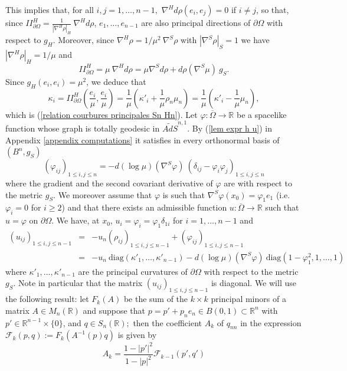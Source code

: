 \documentclass[10pt,reqno,oneside]{amsart}
\theoremstyle{definition}
\theoremstyle{remark}
\newcommand{\R}{\mathbb{R}}
\begin{document}
This implies that, for all $i,j=1,\ldots,n-1,$ $\nabla^{H}d\rho(e_i,e_j)=0$ if $i\neq j$, so that, since $II_{\partial\Omega}^H=\frac{1}{|\nabla^H\rho|_H}\ \nabla^Hd\rho$, $e_1,\ldots,e_{n-1}$ are also principal directions of $\partial\Omega$ with respect to $g_{H}.$ Moreover, since $\nabla^H\rho=1/\mu^2\ \nabla^S\rho$ with $|\nabla^S\rho|_S=1$ we have $|\nabla^H\rho|_H=1/\mu$ and
$$II_{\partial\Omega}^H=\mu\ \nabla^Hd\rho=\mu\nabla^Sd\rho+d\rho(\nabla^S\mu)\ g_S.$$ 
Since $g_{H}(e_i,e_i)=\mu^2$, we deduce that
$$\kappa_i=II_{\partial\Omega}^H\left(\frac{e_i}{\mu},\frac{e_i}{\mu}\right)=\frac{1}{\mu}\left(\kappa'_i+\frac{1}{\mu}\rho_n\mu_n\right)=\frac{1}{\mu}\left(\kappa'_i-\frac{1}{\mu}\mu_n\right),$$
which is (\ref{relation courbures principales Sn Hn}). Let $\varphi:\overline{\Omega}\rightarrow\R$ be a spacelike function whose graph is totally geodesic in $\widetilde{AdS}^{n,1}.$ By (\ref{lem expr h u}) in Appendix \ref{appendix computations} it satisfies in every orthonormal basis of $(B^n,g_S)$
$$\left(\varphi_{ij}\right)_{1\leq i,j\leq n}=-d(\log\mu)(\nabla^S\varphi)\ \left(\delta_{ij}-\varphi_i\varphi_j\right)_{1\leq i,j\leq n}$$
where the gradient and the second covariant derivative of $\varphi$ are with respect to the metric $g_S.$ We moreover assume that $\varphi$ is such that  $\nabla^S \varphi(x_0)=\varphi_1e_1$ (i.e. $\varphi_i=0$ for $i\geq 2$) and that there exists an admissible function $u:\overline{\Omega}\rightarrow\R$ such that $u=\varphi$ on $\partial\Omega.$ We have, at $x_0$,
$u_i=\varphi_i=\varphi_1\delta_{1i}$ for $i=1,\ldots,n-1$ and 
\begin{eqnarray}
\left(u_{ij}\right)_{1\leq i,j\leq n-1}&=&-u_n\left(\rho_{ij}\right)_{1\leq i,j\leq n-1}+\left(\varphi_{ij}\right)_{1\leq i,j\leq n-1}\nonumber\label{expr uij diag}\\
&=&-u_n\ \mbox{diag}(\kappa'_1,\ldots,\kappa'_{n-1})-d(\log\mu)(\nabla^S\varphi)\ \mbox{diag}(1-\varphi_1^2,1,\ldots,1)\label{expr uij diag}
\end{eqnarray}
where $\kappa'_1,\ldots,\kappa'_{n-1}$ are the principal curvatures of $\partial\Omega$ with respect to the metric $g_{S}.$ Note in particular that the matrix $\left(u_{ij}\right)_{1\leq i,j\leq n-1}$ is diagonal. We will use the following result: let $F_k(A)$ be the sum of the $k\times k$ principal minors of a matrix $A\in M_n(\R)$ and suppose that $p=p'+p_n e_n\in B(0,1)\subset\R^n$ with $p'\in\R^{n-1}\times\{0\}$, and $q\in S_n(\R);$ then the coefficient $A_{k}$ of $q_{nn}$ in the expression $\mathcal{F}_k(p,q):=F_k(A^{-1}(p)q)$ is given by
$$A_k=\frac{1-|p'|^2}{1-|p|^2}\mathcal{F}_{k-1}(p',q')$$
\end{document}
